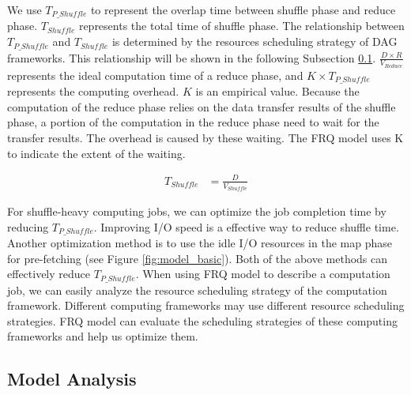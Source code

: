 {We use \(T_{P\_Shuffle}\) to represent the overlap time between shuffle phase and reduce phase. \(T_{Shuffle}\) represents the total time of shuffle phase. 
The relationship between \(T_{P\_Shuffle}\) and \(T_{Shuffle}\) is determined by the resources scheduling strategy of DAG frameworks. This relationship will be shown in the following Subsection \ref{model_analysis}.  
\(\frac{D \times R}{V_{Reduce}}\) represents the ideal computation time of a reduce phase, and \(K \times T_{P\_Shuffle}\) represents the computing overhead. \(K\) is an empirical value. 
Because the computation of the reduce phase relies on the data transfer results of the shuffle phase, a portion of the computation in the reduce phase need to wait for the transfer results. The overhead is caused by these waiting. The FRQ model uses K to indicate the extent of the waiting.

\begin{equation}
\label{equation_Tshuffle}
\begin{aligned}
    T_{Shuffle} &= {{\frac{D}{V_{Shuffle}}}}
\end{aligned}
\end{equation}

For shuffle-heavy computing jobs, we can optimize the job completion time by reducing \(T_{P\_Shuffle}\). Improving I/O speed is a effective way to reduce shuffle time. Another optimization method is to use the idle I/O resources in the map phase for pre-fetching (see Figure \ref{fig:model_basic}). Both of the above methods can effectively reduce \(T_{P\_Shuffle}\). When using FRQ model to describe a computation job, we can easily analyze the resource scheduling strategy of the computation framework. Different computing frameworks may use different resource scheduling strategies. FRQ model can evaluate the scheduling strategies of these computing frameworks and help us optimize them.

\subsection{Model Analysis}\label{model_analysis}

}
